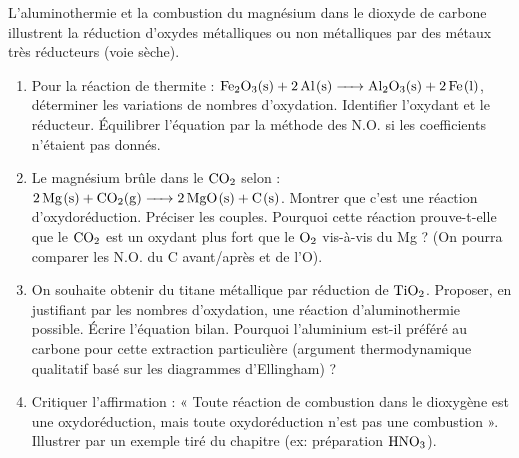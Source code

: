 \documentclass[11pt]{article}
\begin{document}
\begin{exercice}
L'aluminothermie et la combustion du magnésium dans le dioxyde de carbone illustrent la réduction d'oxydes métalliques ou non métalliques par des métaux très réducteurs (voie sèche).
\begin{enumerate}
    \item Pour la réaction de thermite : $\ce{Fe2O3(s) + 2Al(s) -> Al2O3(s) + 2Fe(l)}$, déterminer les variations de nombres d'oxydation. Identifier l'oxydant et le réducteur. Équilibrer l'équation par la méthode des N.O. si les coefficients n'étaient pas donnés.
    \item Le magnésium brûle dans le $\ce{CO2}$ selon : $\ce{2Mg(s) + CO2(g) -> 2MgO(s) + C(s)}$. Montrer que c'est une réaction d'oxydoréduction. Préciser les couples. Pourquoi cette réaction prouve-t-elle que le $\ce{CO2}$ est un oxydant plus fort que le $\ce{O2}$ vis-à-vis du Mg ? (On pourra comparer les N.O. du C avant/après et de l'O).
    \item On souhaite obtenir du titane métallique par réduction de $\ce{TiO2}$. Proposer, en justifiant par les nombres d'oxydation, une réaction d'aluminothermie possible. Écrire l'équation bilan. Pourquoi l'aluminium est-il préféré au carbone pour cette extraction particulière (argument thermodynamique qualitatif basé sur les diagrammes d'Ellingham) ?
    \item Critiquer l'affirmation : « Toute réaction de combustion dans le dioxygène est une oxydoréduction, mais toute oxydoréduction n'est pas une combustion ». Illustrer par un exemple tiré du chapitre (ex: préparation $\ce{HNO3}$).
\end{enumerate}
\end{exercice}
\end{document}
